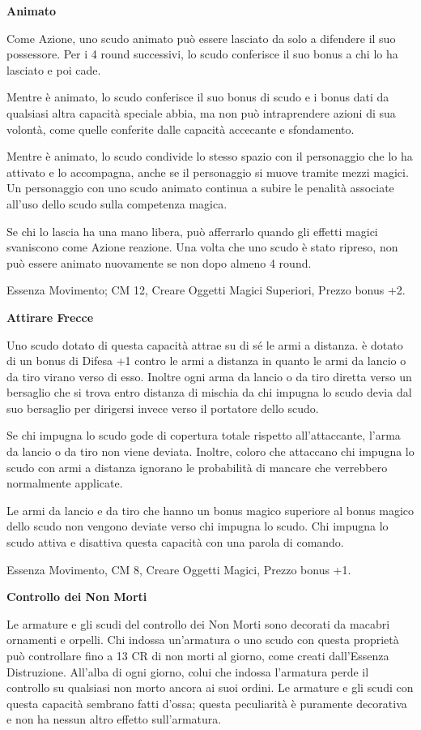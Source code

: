 \documentclass[a4paper,11pt,twoside,openany]{book}
\begin{document}
{\textbf{Animato}

Come Azione, uno scudo animato può essere lasciato da solo a difendere il suo possessore. Per i 4 round successivi, lo scudo conferisce il suo bonus a chi lo ha lasciato e poi cade. 

Mentre è animato, lo scudo conferisce il suo bonus di scudo e i bonus dati da qualsiasi altra capacità speciale abbia, ma non può intraprendere azioni di sua volontà, come quelle conferite dalle capacità accecante e sfondamento. 

Mentre è animato, lo scudo condivide lo stesso spazio con il personaggio che lo ha attivato e lo accompagna, anche se il personaggio si muove tramite mezzi magici. Un personaggio con uno scudo animato continua a subire le penalità associate all'uso dello scudo sulla competenza magica.

Se chi lo lascia ha una mano libera, può afferrarlo quando gli effetti magici svaniscono come Azione reazione. Una volta che uno scudo è stato ripreso, non può essere animato nuovamente se non dopo almeno 4 round.

Essenza Movimento; CM 12, Creare Oggetti Magici Superiori, Prezzo bonus +2.

\textbf{Attirare Frecce}

Uno scudo dotato di questa capacità attrae su di sé le armi a distanza. è dotato di un bonus di Difesa +1 contro le armi a distanza in quanto le armi da lancio o da tiro virano verso di esso. Inoltre ogni arma da lancio o da tiro diretta verso un bersaglio che si trova entro distanza di mischia da chi impugna lo scudo devia dal suo bersaglio per dirigersi invece verso il portatore dello scudo.

Se chi impugna lo scudo gode di copertura totale rispetto all'attaccante, l'arma da lancio o da tiro non viene deviata. Inoltre, coloro che attaccano chi impugna lo scudo con armi a distanza ignorano le probabilità di mancare che verrebbero normalmente applicate.

Le armi da lancio e da tiro che hanno un bonus magico superiore al bonus magico dello scudo non vengono deviate verso chi impugna lo scudo. Chi impugna lo scudo attiva e disattiva questa capacità con una parola di comando.

Essenza Movimento, CM 8, Creare Oggetti Magici, Prezzo bonus +1.

\textbf{Controllo dei Non Morti}

Le armature e gli scudi del controllo dei Non Morti sono decorati da macabri ornamenti e orpelli. Chi indossa un'armatura o uno scudo con questa proprietà può controllare fino a 13 CR di non morti al giorno, come creati dall'Essenza Distruzione. All'alba di ogni giorno, colui che indossa l'armatura perde il controllo su qualsiasi non morto ancora ai suoi ordini. Le armature e gli scudi con questa capacità sembrano fatti d'ossa; questa peculiarità è puramente decorativa e non ha nessun altro effetto sull'armatura.

}
\end{document}
